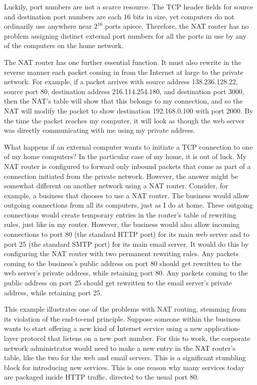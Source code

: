 Luckily, port numbers are not a scarce resource.  The TCP header
fields for source and destination port numbers are each 16 bits in
size, yet computers do not ordinarily use anywhere near $2^{16}$ ports
apiece.  Therefore, the NAT router has no problem assigning distinct
external port numbers for all the ports in use by any of the computers
on the home network.

The NAT router has one further essential function.  It must also rewrite
in the reverse manner each packet coming in from the Internet at large
to the private network.  For example, if a packet arrives with
source address 138.236.128.22, source port 80, destination address 216.114.254.180, and destination port 3000,
then the NAT's table will show that this belongs to my connection, and
so the NAT will modify the packet to show destination 192.168.0.100
with port 2000.  By the time the packet reaches my computer, it will
look as though the web server was directly communicating with me using
my private address.

What happens if an external computer wants to initiate a TCP
connection to one of my home computers?  In the particular case of my
home, it is out of luck.  My NAT router is configured to forward only
inbound packets that come as part of a connection initiated from the
private network. However, the answer might be somewhat different on
another network using a NAT router.  Consider, for example, a business
that chooses to use a NAT router.
The business would allow outgoing connections from all its computers,
just as I do at home.  These outgoing connections would create
temporary entries in the router's table of rewriting rules, just like
in my router.  However, the business would also allow incoming
connections to port 80 (the standard HTTP port) for its main web
server and to port 25 (the standard SMTP port) for its main email
server.  It would do this by configuring the NAT router with two
permanent rewriting rules.  Any packets coming to the business's
public address on port 80 should get rewritten to the web server's
private address, while retaining port 80.  Any packets coming to the
public address on port 25 should get rewritten to the email server's
private address, while retaining port 25.

This example illustrates one of the problems with NAT routing,
stemming from its violation of the end-to-end principle.  Suppose
someone within the business wants to start offering a new kind of
Internet service using a new application-layer protocol that listens
on a new port number.  For this to work, the corporate network
administrator would need to make a new entry in the NAT router's
table, like the two for the web and email servers.  This is a
significant stumbling block for introducing new services.  This is one
reason why many services today are packaged inside HTTP traffic,
directed to the usual port 80.

